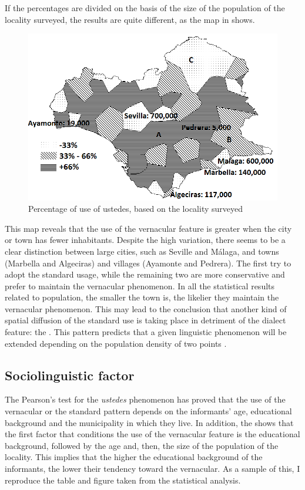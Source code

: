 \documentclass[output=paper]{LSP/langsci}
\begin{document}
If the percentages are divided on the basis of the size of the population of the locality surveyed, the results are quite different, as the map in  shows.

\begin{figure}
\includegraphics[width=\textwidth]{illustrations/lara_fig4}
\caption{Percentage of use of ustedes, based on the locality surveyed}
\label{fig:4}
\end{figure}
  
This map reveals that the use of the vernacular feature is greater when the city or town has fewer inhabitants. Despite the high variation, there seems to be a clear distinction between large cities, such as Seville and Málaga, and towns (Marbella and Algeciras) and villages (Ayamonte and Pedrera). The first try to adopt the standard usage, while the remaining two are more conservative and prefer to maintain the vernacular phenomenon. In all the statistical results related to population, the smaller the town is, the likelier they maintain the vernacular phenomenon. This may lead to the conclusion that another kind of spatial diffusion of the standard use is taking place in detriment of the dialect feature: the . This pattern predicts that a given linguistic phenomenon will be extended depending on the population density of two points \citep{wolfram_dialectology_2003}.

\subsection{Sociolinguistic factor}
The Pearson’s  test for the \textit{ustedes} phenomenon has proved that the use of the vernacular or the standard pattern depends on the informants’ age, educational background and the municipality in which they live. In addition, the  shows that the first factor that conditions the use of the vernacular feature is the educational background, followed by the age and, then, the size of the population of the locality. This implies that the higher the educational background of the informants, the lower their tendency toward the vernacular. As a sample of this, I reproduce the table and figure taken from the statistical analysis.
\end{document}

